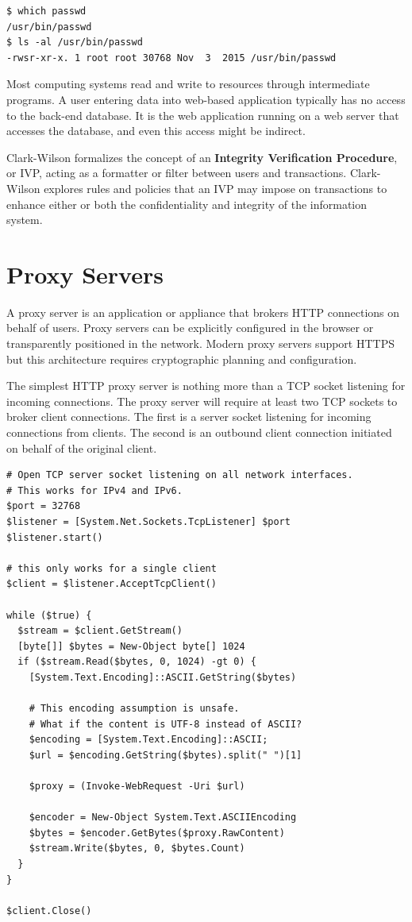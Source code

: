 \documentclass{book}
\begin{document}
\begin{lstlisting}[caption={The \texttt{s} in \texttt{rws} indicates the \texttt{setuid} bit is active.}]
$ which passwd
/usr/bin/passwd
$ ls -al /usr/bin/passwd
-rwsr-xr-x. 1 root root 30768 Nov  3  2015 /usr/bin/passwd
\end{lstlisting}

Most computing systems read and write to resources through intermediate programs. A user entering data into web-based application typically has no access to the back-end database. It is the web application running on a web server that accesses the database, and even this access might be indirect.

Clark-Wilson formalizes the concept of an \textbf{Integrity Verification Procedure}, or IVP, acting as a formatter or filter between users and transactions. Clark-Wilson explores rules and policies that an IVP may impose on transactions to enhance either or both the confidentiality and integrity of the information system.

\section{Proxy Servers}

A proxy server is an application or appliance that brokers HTTP connections on behalf of users. Proxy servers can be explicitly configured in the browser or transparently positioned in the network. Modern proxy servers support HTTPS but this architecture requires cryptographic planning and configuration.

The simplest HTTP proxy server is nothing more than a TCP socket listening for incoming connections. The proxy server will require at least two TCP sockets to broker client connections. The first is a server socket listening for incoming connections from clients. The second is an outbound client connection initiated on behalf of the original client.

\begin{lstlisting}[caption={A simple HTTP proxy written in PowerShell},label=psproxy]
# Open TCP server socket listening on all network interfaces.
# This works for IPv4 and IPv6.
$port = 32768
$listener = [System.Net.Sockets.TcpListener] $port
$listener.start()

# this only works for a single client
$client = $listener.AcceptTcpClient()

while ($true) {
  $stream = $client.GetStream()
  [byte[]] $bytes = New-Object byte[] 1024
  if ($stream.Read($bytes, 0, 1024) -gt 0) {
    [System.Text.Encoding]::ASCII.GetString($bytes)

    # This encoding assumption is unsafe.
    # What if the content is UTF-8 instead of ASCII?
    $encoding = [System.Text.Encoding]::ASCII;
    $url = $encoding.GetString($bytes).split(" ")[1]

    $proxy = (Invoke-WebRequest -Uri $url)

    $encoder = New-Object System.Text.ASCIIEncoding
    $bytes = $encoder.GetBytes($proxy.RawContent)
    $stream.Write($bytes, 0, $bytes.Count)
  }
}

$client.Close()
\end{lstlisting}
\end{document}
